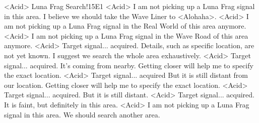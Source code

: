 <Acid> Luna Frag Search!{15}{E1}
<Acid> I am not picking up a Luna Frag signal in this area. 
I believe we should take the Wave Liner to <Alohaha>. 
<Acid> I am not picking up a Luna Frag signal in the Real World of this area anymore. 
<Acid> I am not picking up a Luna Frag signal in the Wave Road of this area anymore. 
<Acid> Target signal... acquired. 
Details, such as specific location, are not yet known. 
I suggest we search the whole area exhaustively. 
<Acid> Target signal... acquired. It's coming from nearby. 
Getting closer will help me to specify the exact location. 
<Acid> Target signal... acquired But it is still distant from our location. 
Getting closer will help me to specify the exact location. 
<Acid> Target signal... acquired. But it is still distant. 
<Acid> Target signal... acquired. It is faint, but definitely in this area. 
<Acid> I am not picking up a Luna Frag signal in this area. We should search another area. 
